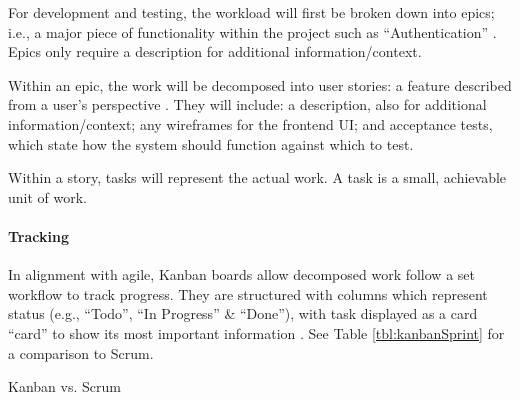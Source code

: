 For development and testing, the workload will first be
broken down into epics; i.e., a major piece of
functionality within the project such as
\enquote{Authentication} \parencite{agile}.
Epics only require a description for additional
information/context.

Within an epic, the work will be decomposed into user
stories: a feature described from a user's perspective
\parencite{agile}.
They will include: a description, also for additional
information/context; any wireframes for the frontend UI;
and acceptance tests, which state how the system should
function against which to test.

Within a story, tasks will represent the actual work.
A task is a small, achievable unit of work.

\paragraph{Tracking}

In alignment with agile, Kanban boards allow decomposed
work follow a set workflow to track progress.
They are structured with columns which represent status
(e.g., \enquote{Todo}, \enquote{In Progress} \&
\enquote{Done}), with task displayed as a card
\enquote{card} to show its most important information
\parencite{kanban}.
See Table \ref{tbl:kanbanSprint} for a comparison to Scrum.

\begin{table}[h]
  \centering
  
  \caption{Kanban vs. Scrum}
  \parencite{kanban}
  \label{tbl:kanbanSprint}
\end{table}
